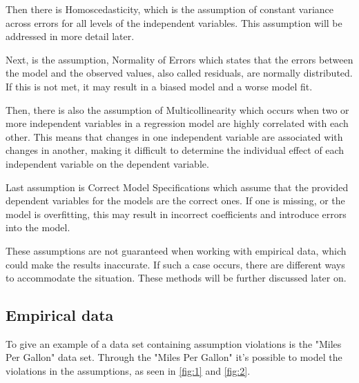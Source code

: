 \noindent Then there is Homoscedasticity, which is the assumption of constant variance across errors for all levels of the independent variables. This assumption will be addressed in more detail later. \newline

\noindent Next, is the assumption, Normality of Errors which states that the errors between the model and the observed values, also called residuals, are normally distributed. If this is not met, it may result in a biased model and a worse model fit. \newline


\noindent Then, there is also the assumption of Multicollinearity which occurs when two or more independent variables in a regression model are highly correlated with each other. This means that changes in one independent variable are associated with changes in another, making it difficult to determine the individual effect of each independent variable on the dependent variable. \newline

\noindent Last assumption is Correct Model Specifications which assume that the provided dependent variables for the models are the correct ones. If one is missing, or the model is overfitting, this may result in incorrect coefficients and introduce errors into the model. \newline

\noindent These assumptions are not guaranteed when working with empirical data, which could make the results inaccurate. 
If such a case occurs, there are different ways to accommodate the situation. These methods will be further discussed later on. \newline 

 

\subsection{Empirical data}
To give an example of a data set containing assumption violations is the "Miles Per Gallon" data set. Through the "Miles Per Gallon" it's possible to model the violations in the assumptions, as seen in \autoref{fig:1} and \autoref{fig:2}.
\newline

